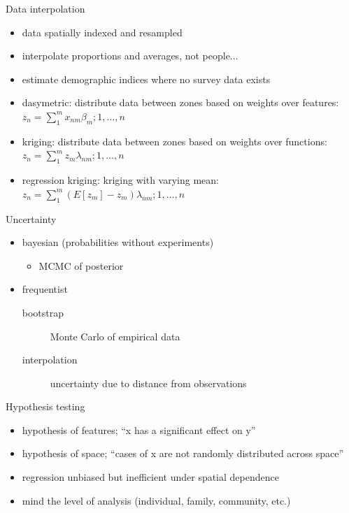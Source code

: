 \documentclass{beamer}
\begin{document}
\begin{frame}{Data interpolation}
  \begin{itemize}
  \item data spatially indexed and resampled
  \item interpolate proportions and averages, not people...
  \item estimate demographic indices where no survey data exists
  \item dasymetric: distribute data between zones based on weights over features:\\
    $z_n = \sum_1^m x_{nm} \beta_m; {1, \dots, n}$
  \item kriging: distribute data between zones based on weights over functions:\\
    $z_n = \sum_1^m z_m \lambda_{nm}; {1, \dots, n}$
  \item regression kriging: kriging with varying mean:\\
    $z_n = \sum_1^m (E[z_m]-z_m) \lambda_{nm}; {1, \dots, n}$
  \end{itemize}
\end{frame}


\begin{frame}{Uncertainty}
  \begin{itemize}
  \item bayesian (probabilities without experiments)
    \begin{itemize}
    \item MCMC of posterior
    \end{itemize}
  \item frequentist
    \begin{description}
    \item [bootstrap] Monte Carlo of empirical data
    \item [interpolation] uncertainty due to distance from observations
    \end{description}
  \end{itemize}
\end{frame}


\begin{frame}{Hypothesis testing}
  \begin{itemize}
  \item hypothesis of features; ``x has a significant effect on y''
  \item hypothesis of space; ``cases of x are not randomly distributed across space''
  \item regression unbiased but inefficient under spatial dependence
  \item mind the level of analysis (individual, family, community, etc.)
  \end{itemize}
\end{frame}
\end{document}
